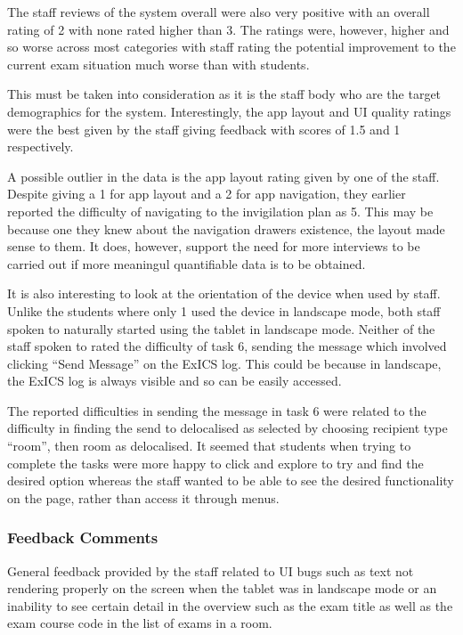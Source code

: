 The staff reviews of the system overall were also very positive with an overall rating of 2 with none rated higher than 3.  The ratings were, however, higher and so worse across most categories with staff rating the potential improvement to the current exam situation much worse than with students.

This must be taken into consideration as it is the staff body who are the target demographics for the system.  Interestingly, the app layout and UI quality ratings were the best given by the staff giving feedback with scores of 1.5 and 1 respectively.

A possible outlier in the data is the app layout rating given by one of the staff.  Despite giving a 1 for app layout and a 2 for app navigation, they earlier reported the difficulty of navigating to the invigilation plan as 5.  This may be because one they knew about the navigation drawers existence, the layout made sense to them.  It does, however, support the need for more interviews to be carried out if more meaningul quantifiable data is to be obtained.

It is also interesting to look at the orientation of the device when used by staff.  Unlike the students where only 1 used the device in landscape mode, both staff spoken to naturally started using the tablet in landscape mode.  Neither of the staff spoken to rated the difficulty of task 6, sending the message which involved clicking ``Send Message'' on the ExICS log.  This could be because in landscape, the ExICS log is always visible and so can be easily accessed.

The reported difficulties in sending the message in task 6 were related to the difficulty in finding the send to delocalised as selected by choosing recipient type ``room'', then room as delocalised.  It seemed that students when trying to complete the tasks were more happy to click and explore to try and find the desired option whereas the staff wanted to be able to see the desired functionality on the page, rather than access it through menus.

\subsubsection{Feedback Comments}

General feedback provided by the staff related to UI bugs such as text not rendering properly on the screen when the tablet was in landscape mode or an inability to see certain detail in the overview such as the exam title as well as the exam course code in the list of exams in a room.

